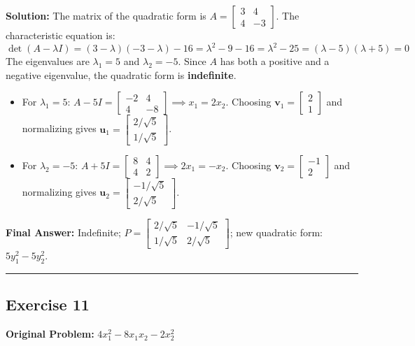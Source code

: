 \documentclass[11pt, letterpaper]{article}
\theoremstyle{definition}
\theoremstyle{remark}
\begin{document}
\textbf{Solution:}
The matrix of the quadratic form is $A = \begin{bmatrix} 3 & 4 \\ 4 & -3 \end{bmatrix}$.
The characteristic equation is:
\[
\det(A - \lambda I) = (3 - \lambda)(-3 - \lambda) - 16 = \lambda^2 - 9 - 16 = \lambda^2 - 25 = (\lambda - 5)(\lambda + 5) = 0
\]
The eigenvalues are $\lambda_1 = 5$ and $\lambda_2 = -5$. Since $A$ has both a positive and a negative eigenvalue, the quadratic form is \textbf{indefinite}.
\begin{itemize}
    \item For $\lambda_1 = 5$: $A - 5I = \begin{bmatrix} -2 & 4 \\ 4 & -8 \end{bmatrix} \implies x_1 = 2x_2$. Choosing $\mathbf{v}_1 = \begin{bmatrix} 2 \\ 1 \end{bmatrix}$ and normalizing gives $\mathbf{u}_1 = \begin{bmatrix} 2/\sqrt{5} \\ 1/\sqrt{5} \end{bmatrix}$.
    \item For $\lambda_2 = -5$: $A + 5I = \begin{bmatrix} 8 & 4 \\ 4 & 2 \end{bmatrix} \implies 2x_1 = -x_2$. Choosing $\mathbf{v}_2 = \begin{bmatrix} -1 \\ 2 \end{bmatrix}$ and normalizing gives $\mathbf{u}_2 = \begin{bmatrix} -1/\sqrt{5} \\ 2/\sqrt{5} \end{bmatrix}$.
\end{itemize}
\textbf{Final Answer:} Indefinite; $P = \begin{bmatrix} 2/\sqrt{5} & -1/\sqrt{5} \\ 1/\sqrt{5} & 2/\sqrt{5} \end{bmatrix}$; new quadratic form: $5y_1^2 - 5y_2^2$.

\medskip\hrule\medskip

\subsection*{Exercise 11}
\textbf{Original Problem:} $4x_1^2 - 8x_1x_2 - 2x_2^2$
\end{document}
